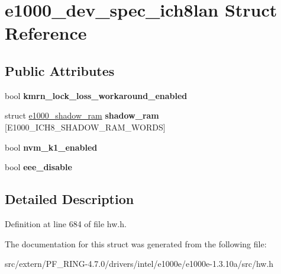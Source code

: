 \hypertarget{structe1000__dev__spec__ich8lan}{
\section{e1000\_\-dev\_\-spec\_\-ich8lan Struct Reference}
\label{structe1000__dev__spec__ich8lan}
}
\subsection*{Public Attributes}
\begin{DoxyCompactItemize}
\item 
\hypertarget{structe1000__dev__spec__ich8lan_a83ca6d5f8f7f2d8e2518b612885a8e5b}{
bool {\bfseries kmrn\_\-lock\_\-loss\_\-workaround\_\-enabled}}
\label{structe1000__dev__spec__ich8lan_a83ca6d5f8f7f2d8e2518b612885a8e5b}

\item 
\hypertarget{structe1000__dev__spec__ich8lan_a20214e0416cde7b4f991cb9943f24117}{
struct \hyperlink{structe1000__shadow__ram}{e1000\_\-shadow\_\-ram} {\bfseries shadow\_\-ram} \mbox{[}E1000\_\-ICH8\_\-SHADOW\_\-RAM\_\-WORDS\mbox{]}}
\label{structe1000__dev__spec__ich8lan_a20214e0416cde7b4f991cb9943f24117}

\item 
\hypertarget{structe1000__dev__spec__ich8lan_af99447e79f5a0d4db8d4e23d0ac2fe70}{
bool {\bfseries nvm\_\-k1\_\-enabled}}
\label{structe1000__dev__spec__ich8lan_af99447e79f5a0d4db8d4e23d0ac2fe70}

\item 
\hypertarget{structe1000__dev__spec__ich8lan_a2856bb03a6da6dce1c958bd3d09ab365}{
bool {\bfseries eee\_\-disable}}
\label{structe1000__dev__spec__ich8lan_a2856bb03a6da6dce1c958bd3d09ab365}

\end{DoxyCompactItemize}


\subsection{Detailed Description}


Definition at line 684 of file hw.h.



The documentation for this struct was generated from the following file:\begin{DoxyCompactItemize}
\item 
src/extern/PF\_\-RING-\/4.7.0/drivers/intel/e1000e/e1000e-\/1.3.10a/src/hw.h\end{DoxyCompactItemize}
